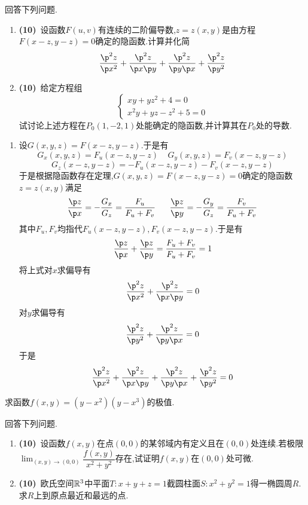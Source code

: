 \documentclass{ctexart}
\begin{document}
\begin{problem}[2.(20\songti{分})]
    回答下列问题.
    \begin{enumerate}[label=\tbf{(\arabic*)}]
        \item \textbf{(10)}\ 设函数$F(u,v)$有连续的二阶偏导数,$z=z(x,y)$是由方程$F(x-z,y-z)=0$确定的隐函数.计算并化简
            \[\dfrac{\p^2z}{\p x^2}+\dfrac{\p^2z}{\p x\p y}+\dfrac{\p^2z}{\p y\p x}+\dfrac{\p^2z}{\p y^2}\]
        \item \textbf{(10)}\ 给定方程组
            \[\left\{\begin{array}{l}
                xy+yz^2+4=0\\
                x^2y+yz-z^2+5=0
            \end{array}\right.\]
            试讨论上述方程在$P_0\left(1,-2,1\right)$处能确定的隐函数,并计算其在$P_0$处的导数.
    \end{enumerate}
\end{problem}
\begin{solution}
    \begin{enumerate}[label=\tbf{(\arabic*)}]
        \item 设$G(x,y,z)=F(x-z,y-z)$.于是有
            \[G_x(x,y,z)=F_u(x-z,y-z)\ \ \ \ \ G_y(x,y,z)=F_v(x-z,y-z)\]
            \[G_z(x-z,y-z)=-F_u(x-z,y-z)-F_v(x-z,y-z)\]
            于是根据隐函数存在定理,$G(x,y,z)=F(x-z,y-z)=0$确定的隐函数$z=z(x,y)$满足
            \[\dfrac{\p z}{\p x}=-\dfrac{G_x}{G_z}=\dfrac{F_u}{F_u+F_v}\ \ \ \ \ \dfrac{\p z}{\p y}=-\dfrac{G_y}{G_z}=\dfrac{F_v}{F_u+F_v}\]
            其中$F_u,F_v$均指代$F_u(x-z,y-z),F_v(x-z,y-z)$.于是有
            \[\dfrac{\p z}{\p x}+\dfrac{\p z}{\p y}=\dfrac{F_u+F_v}{F_u+F_v}=1\]
            将上式对$x$求偏导有
            \[\dfrac{\p^2 z}{\p x^2}+\dfrac{\p^2 z}{\p x\p y}=0\]
            对$y$求偏导有
            \[\dfrac{\p^2 z}{\p y^2}+\dfrac{\p^2 z}{\p y\p x}=0\]
            于是\[\dfrac{\p^2z}{\p x^2}+\dfrac{\p^2z}{\p x\p y}+\dfrac{\p^2z}{\p y\p x}+\dfrac{\p^2z}{\p y^2}=0\]
    \end{enumerate}
\end{solution}
\begin{problem}[3.(20\songti{分})]
    求函数$f(x,y)=\left(y-x^2\right)\left(y-x^3\right)$的极值.
\end{problem}
\begin{problem}[4.(20\songti{分})]
    回答下列问题.
    \begin{enumerate}[label=\tbf{(\arabic*)}]
        \item \textbf{(10)}\ 设函数$f(x,y)$在点$(0,0)$的某邻域内有定义且在$(0,0)$处连续.若极限$\displaystyle\lim_{(x,y)\to(0,0)}\dfrac{f(x,y)}{x^2+y^2}$存在,试证明$f(x,y)$在$(0,0)$处可微.
        \item \textbf{(10)}\ 欧氏空间$\mathbb{R}^3$中平面$T:x+y+z=1$截圆柱面$S:x^2+y^2=1$得一椭圆周$R$.求$R$上到原点最近和最远的点.
    \end{enumerate}
\end{problem}
\end{document}
